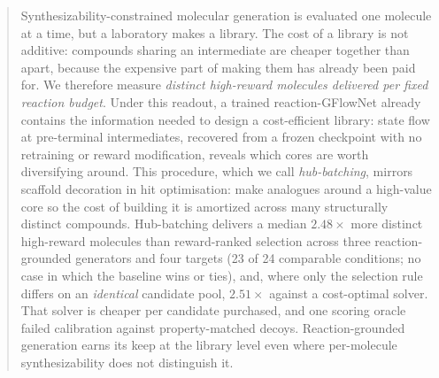 \documentclass{article}
\newcommand{\checkval}[1]{#1}
\begin{document}
\begin{abstract}

Synthesizability-constrained molecular generation is evaluated one molecule at a time, but a laboratory makes a library. The cost of a library is not additive: compounds sharing an intermediate are cheaper together than apart, because the expensive part of making them has already been paid for. We therefore measure \emph{distinct high-reward molecules delivered per fixed reaction budget}. Under this readout, a trained reaction-GFlowNet already contains the information needed to design a cost-efficient library: state flow at pre-terminal intermediates, recovered from a frozen checkpoint with no retraining or reward modification, reveals which cores are worth diversifying around. This procedure, which we call \emph{hub-batching}, mirrors scaffold decoration in hit optimisation: make analogues around a high-value core so the cost of building it is amortized across many structurally distinct compounds. Hub-batching delivers a median \checkval{$2.48\times$} more distinct high-reward molecules than reward-ranked selection across three reaction-grounded generators and four targets (\checkval{23 of 24} comparable conditions; no case in which the baseline wins or ties), and, where only the selection rule differs on an \emph{identical} candidate pool, \checkval{$2.51\times$} against a cost-optimal solver. That solver is cheaper per candidate purchased, and one scoring oracle failed calibration against property-matched decoys. Reaction-grounded generation earns its keep at the library level even where per-molecule synthesizability does not distinguish it.
\end{abstract}

\end{document}
